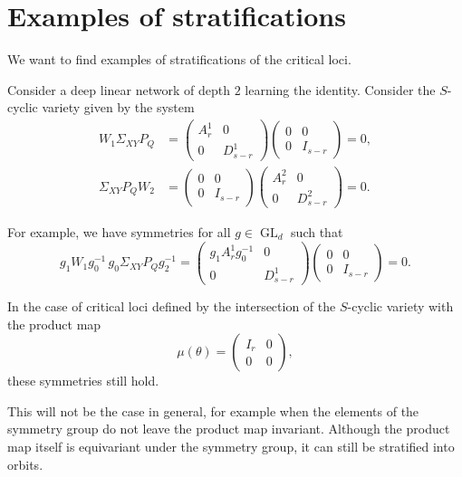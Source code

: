 \documentclass[11pt]{article}
\newcommand{\GL}{\operatorname{GL}}
\begin{document}
\section{Examples of stratifications}

We want to find examples of stratifications of the critical loci.

Consider a deep linear network of depth \(2\) learning the identity. Consider
the \(S\)-cyclic variety given by the system
\begin{align*}
W_1\Sigma_{XY}P_Q
&=
\begin{pmatrix}
    A^1_r & 0 \\
    0 & D^1_{s-r}
\end{pmatrix}
\begin{pmatrix}
    0 & 0 \\
    0 & I_{s-r}
\end{pmatrix}
= 0, \\
\Sigma_{XY}P_QW_2
&=
\begin{pmatrix}
    0 & 0 \\
    0 & I_{s-r}
\end{pmatrix}
\begin{pmatrix}
    A^2_r & 0 \\
    0 & D^2_{s-r}
\end{pmatrix}
= 0.
\end{align*}

For example, we have symmetries for all \(g \in \GL_d\) such that
\[
g_1W_1g_0^{-1}\, g_0\Sigma_{XY}P_Qg_2^{-1}
=
\begin{pmatrix}
    g_1A^1_rg_0^{-1} & 0 \\
    0 & D^1_{s-r}
\end{pmatrix}
\begin{pmatrix}
    0 & 0 \\
    0 & I_{s-r}
\end{pmatrix}
= 0.
\]

In the case of critical loci defined by the intersection of the \(S\)-cyclic
variety with the product map
\[
\mu(\theta)=
\begin{pmatrix}
    I_r & 0 \\
    0 & 0
\end{pmatrix},
\]
these symmetries still hold.

This will not be the case in general, for example when the elements of the
symmetry group do not leave the product map invariant. Although the product map
itself is equivariant under the symmetry group, it can still be stratified into
orbits.
\end{document}
